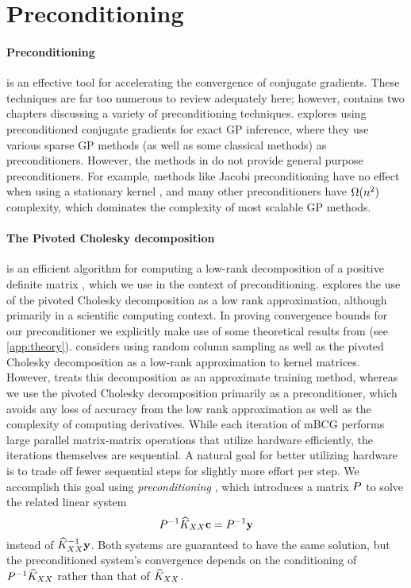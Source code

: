\section{Preconditioning}
\label{sec:preconditioning}

\paragraph{Preconditioning} is an effective tool for accelerating the convergence of conjugate gradients.
These techniques are far too numerous to review adequately here; however, \citet{saad2003iterative} contains two chapters discussing a variety of preconditioning techniques.
\citet{cutajar2016preconditioning} explores using preconditioned conjugate gradients for exact GP inference, where they use various sparse GP methods (as well as some classical methods) as preconditioners. However, the methods in \citet{cutajar2016preconditioning} do not provide general purpose preconditioners.
For example, methods like Jacobi preconditioning have no effect when using a stationary kernel \cite{cutajar2016preconditioning,wilson2015thoughts}, and many other preconditioners have $\bigomega{n^{2}}$ complexity, which dominates the complexity of most scalable GP methods.

\paragraph{The Pivoted Cholesky decomposition}
is an efficient algorithm for computing a low-rank decomposition of a positive definite matrix \cite{harbrecht2012low,bach2013sharp}, which we use in the context of preconditioning.
\citet{harbrecht2012low} explores the use of the pivoted Cholesky decomposition as a low rank approximation, although primarily in a scientific computing context.
In proving convergence bounds for our preconditioner we explicitly make use of some theoretical results from \cite{harbrecht2012low} (see \cref{app:theory}).
\citet{bach2013sharp} considers using random column sampling as well as the pivoted Cholesky decomposition as a low-rank approximation to kernel matrices.
However, \citet{bach2013sharp} treats this decomposition as an approximate training method, whereas we use the pivoted Cholesky decomposition primarily
as a preconditioner, which avoids any loss of accuracy from the low rank approximation as well as the complexity of computing derivatives.
While each iteration of mBCG performs large parallel matrix-matrix operations that utilize hardware efficiently, the iterations themselves are sequential.
A natural goal for better utilizing hardware is to trade off fewer sequential steps for slightly more effort per step.
We accomplish this goal using \emph{preconditioning} \cite{golub2012matrix,saad2003iterative,demmel1997applied,van2003iterative}, which introduces a matrix $P$ to solve the related linear system
\begin{equation*}
  P^{-1} \widehat{K}_{XX} \mathbf{c} = P^{-1}\mathbf{y}
\end{equation*}
instead of $\widehat{K}_{XX}^{-1} \mathbf{y}$.
Both systems are guaranteed to have the same solution, but the preconditioned system's convergence depends on the conditioning of $P^{-1}\widehat{K}_{XX}$ rather than that of $\widehat{K}_{XX}$.

